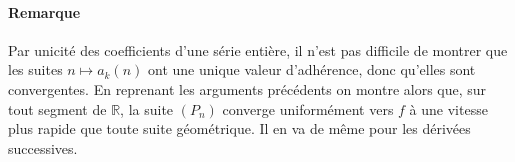 \paragraph{Remarque}
Par unicité des coefficients d'une série entière, il n'est pas difficile de montrer que les suites $n \mapsto a_k(n)$ ont une unique valeur d'adhérence, donc qu'elles sont convergentes. En reprenant les arguments précédents on montre alors que, sur tout segment de $\mathbb R$, la suite $(P_n)$ converge uniformément vers $f$ à une vitesse plus rapide que toute suite géométrique. Il en va de même pour les dérivées successives.